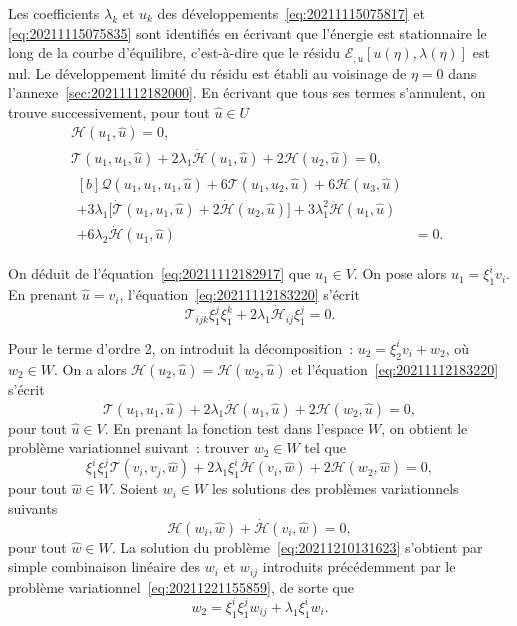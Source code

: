 \documentclass[12pt, final]{amsart}
\begin{document}
Les coefficients \(\lambda_k\) et \(u_k\) des
développements~\eqref{eq:20211115075817} et \eqref{eq:20211115075835} sont
identifiés en écrivant que l'énergie est stationnaire le long de la courbe
d'équilibre, c'est-à-dire que le résidu
\(ℰ_{,u}[u(η), \lambda(η)]\) est nul. Le développement limité du
résidu est établi au voisinage de \(η=0\) dans
l'annexe~\ref{sec:20211112182000}. En écrivant que tous ses termes s'annulent,
on trouve successivement, pour tout \(\hat{u}\in U\)
\begin{gather}
  \label{eq:20211112182917}
  \mathcal H(u_1, \hat{u})=0,\\
  \label{eq:20211112183220}
  \mathcal T(u_1, u_1, \hat{u})
  +2\lambda_1\dot{\mathcal H}(u_1, \hat{u})
  +2\mathcal H(u_2, \hat{u})=0,\\
  \begin{aligned}[b]
    \mathcal Q(u_1, u_1, u_1, \hat{u})
    +6\mathcal T(u_1, u_2, \hat{u})+6\mathcal H(u_3, \hat{u})&\\
    +3\lambda_1\bigl[\dot{\mathcal T}(u_1, u_1, \hat{u})
    +2\dot{\mathcal H}(u_2, \hat{u})\bigr]
    +3\lambda_1^2\ddot{\mathcal H}(u_1, \hat{u})&\\
    +6\lambda_2\dot{\mathcal H}(u_1, \hat{u})&=0.
  \end{aligned}
\end{gather}

On déduit de l'équation~\eqref{eq:20211112182917} que \(u_1\in V\). On pose
alors \(u_1=ξ_1^i v_i\). En prenant \(\hat{u}=v_i\),
l'équation~\eqref{eq:20211112183220} s'écrit
\begin{equation}
  \mathcal T_{ijk}ξ_1^jξ_1^k+2\lambda_1\dot{\mathcal H}_{ij}ξ_1^j=0.
\end{equation}

Pour le terme d'ordre 2, on introduit la décomposition~:
\(u_2=ξ_2^iv_i+w_2\), où \(w_2\in W\). On a alors
\(\mathcal H(u_2, \hat{u})=\mathcal H(w_2, \hat{u})\) et
l'équation~\eqref{eq:20211112183220} s'écrit
\begin{equation}
  \mathcal T(u_1, u_1, \hat{u})+2\lambda_1\dot{\mathcal H}(u_1, \hat{u})
  +2\mathcal H(w_2, \hat{u})=0,
\end{equation}
pour tout \(\hat{u}\in V\). En prenant la fonction test dans l'espace \(W\), on
obtient le problème variationnel suivant~: trouver \(w_2\in W\) tel
que
\begin{equation}
  \label{eq:20211210131623}
  ξ_1^iξ_1^j\mathcal T(v_i, v_j, \hat{w})
  +2\lambda_1ξ_1^i\dot{\mathcal H}(v_i, \hat{w})
  +2\mathcal H(w_2, \hat{w})=0,
\end{equation}
pour tout \(\hat{w}\in W\). Soient \(w_i\in W\) les solutions des problèmes
variationnels suivants
\begin{equation}
  \mathcal H(w_i, \hat{w})+\dot{\mathcal H}(v_i, \hat{w})=0,
\end{equation}
pour tout \(\hat{w}\in W\). La solution du problème~\eqref{eq:20211210131623}
s'obtient par simple combinaison linéaire des \(w_i\) et \(w_{ij}\) introduits
précédemment par le problème variationnel~\eqref{eq:20211221155859}, de sorte
que
\begin{equation}
  w_2=ξ_1^iξ_1^jw_{ij}+\lambda_1ξ_1^i w_i.
\end{equation}
\end{document}
